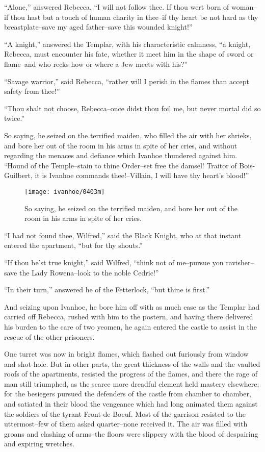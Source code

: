 ``Alone,'' answered Rebecca, ``I will not follow thee. If thou wert born
of woman--if thou hast but a touch of human charity in thee--if thy
heart be not hard as thy breastplate--save my aged father--save this
wounded knight!''

``A knight,'' answered the Templar, with his characteristic calmness,
``a knight, Rebecca, must encounter his fate, whether it meet him in the
shape of sword or flame--and who recks how or where a Jew meets with
his?''

``Savage warrior,'' said Rebecca, ``rather will I perish in the flames
than accept safety from thee!''

``Thou shalt not choose, Rebecca--once didst thou foil me, but never
mortal did so twice.''

So saying, he seized on the terrified maiden, who filled the air with
her shrieks, and bore her out of the room in his arms in spite of her
cries, and without regarding the menaces and defiance which Ivanhoe
thundered against him. ``Hound of the Temple--stain to thine Order--set
free the damsel! Traitor of Bois-Guilbert, it is Ivanhoe commands
thee!--Villain, I will have thy heart's blood!''

\begin{figure}
    \centering
    \texttt{[image: ivanhoe/0403m]}
    \caption{So saying, he seized on the terrified maiden, and bore her
    out of the room in his arms in spite of her cries.}
\end{figure}

``I had not found thee, Wilfred,'' said the Black Knight, who at that
instant entered the apartment, ``but for thy shouts.''

``If thou be'st true knight,'' said Wilfred, ``think not of me--pursue
yon ravisher--save the Lady Rowena--look to the noble Cedric!''

``In their turn,'' answered he of the Fetterlock, ``but thine is
first.''

And seizing upon Ivanhoe, he bore him off with as much ease as the
Templar had carried off Rebecca, rushed with him to the postern, and
having there delivered his burden to the care of two yeomen, he again
entered the castle to assist in the rescue of the other prisoners.

One turret was now in bright flames, which flashed out furiously from
window and shot-hole. But in other parts, the great thickness of the
walls and the vaulted roofs of the apartments, resisted the progress of
the flames, and there the rage of man still triumphed, as the scarce
more dreadful element held mastery elsewhere; for the besiegers pursued
the defenders of the castle from chamber to chamber, and satiated in
their blood the vengeance which had long animated them against the
soldiers of the tyrant Front-de-Boeuf. Most of the garrison resisted to
the uttermost--few of them asked quarter--none received it. The air was
filled with groans and clashing of arms--the floors were slippery with
the blood of despairing and expiring wretches.


